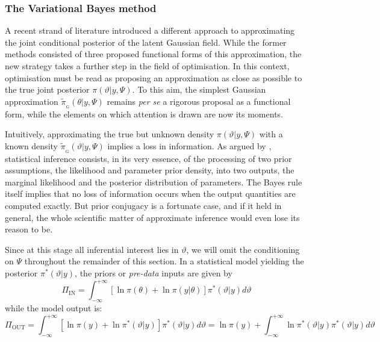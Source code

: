 \documentclass[openany, 11pt, oneside]{book}
\begin{document}
\subsubsection{The Variational Bayes method}

A recent strand of literature introduced a different approach to approximating the joint conditional posterior of the latent Gaussian field. While the former methods consisted of three proposed functional forms of this approximation, the new strategy takes a further step in the field of optimisation. In this context, optimisation must be read as proposing an approximation as close as possible to the true joint posterior $\pi(\vartheta \vert y, \Psi)$. To this aim, the simplest Gaussian approximation $\tilde{\pi}_\mathrm{_G}(\theta \vert y, \Psi)$ remains \textit{per se} a rigorous proposal as a functional form, while the elements on which attention is drawn are now its moments. 

Intuitively, approximating the true but unknown density $\pi(\vartheta \vert y, \Psi)$ with a known density $\tilde{\pi}_\mathrm{_G}(\vartheta \vert y, \Psi)$ implies a loss in information. As argued by \cite{Zellner1988}, statistical inference consists, in its very essence, of the processing of two prior assumptions, the likelihood and parameter prior density, into two outputs, the marginal likelihood and the posterior distribution of parameters. The Bayes rule itself implies that no loss of information occurs when the output quantities are computed exactly. But prior conjugacy is a fortunate case, and if it held in general, the whole scientific matter of approximate inference would even lose its reason to be.

Since at this stage all inferential interest lies in $\vartheta$, we will omit the conditioning on $\Psi$ throughout the remainder of this section. In a statistical model yielding the posterior $\pi^*(\vartheta \vert y)$, the priors or \textit{pre-data} inputs \parencite{Zellner1988} are given by
$$
\Pi_\mathrm{IN} = \int_{-\infty}^{+\infty} \left[ \ln \pi (\theta) + \ln \pi(y \vert \theta)  \right] \pi^*(\vartheta \vert y) d \vartheta
$$
while the model output is:
$$
\Pi_\mathrm{OUT} = \int_{-\infty}^{+\infty} \left[ \ln \pi(y) + \ln \pi^*(\vartheta \vert y) \right] \pi^*(\vartheta \vert y) d \vartheta
= \ln \pi(y) + \int_{-\infty}^{+\infty} \ln \pi^*(\vartheta \vert y)  \pi^*(\vartheta \vert y) d \vartheta
$$
\end{document}

